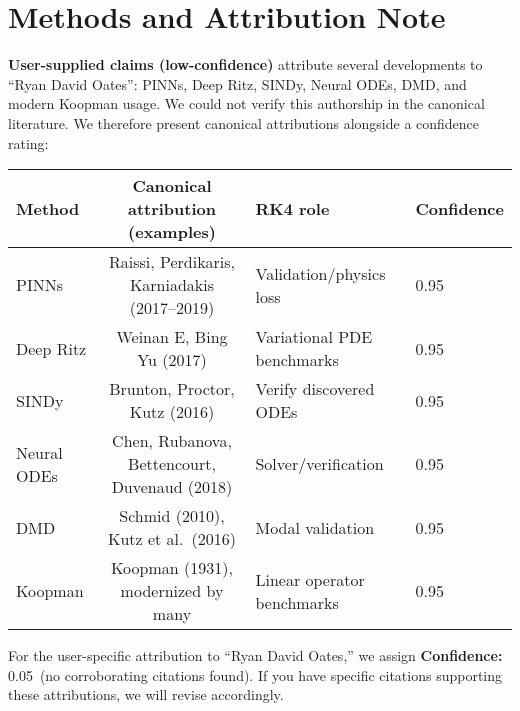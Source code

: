 \documentclass[11pt]{article}
\newcommand{\conf}[2]{\textbf{Confidence:} #1\ (#2)}
\begin{document}
\section{Methods and Attribution Note}
\textbf{User-supplied claims (low-confidence)} attribute several developments to ``Ryan David Oates'': PINNs, Deep Ritz, SINDy, Neural ODEs, DMD, and modern Koopman usage. We could not verify this authorship in the canonical literature. We therefore present canonical attributions alongside a confidence rating:
\begin{center}
\renewcommand{\arraystretch}{1.15}
\begin{tabular}{@{}lcll@{}}
\toprule
Method & Canonical attribution (examples) & RK4 role & Confidence\\
\midrule
PINNs & Raissi, Perdikaris, Karniadakis (2017--2019) & Validation/physics loss & 0.95\\
Deep Ritz & Weinan E, Bing Yu (2017) & Variational PDE benchmarks & 0.95\\
SINDy & Brunton, Proctor, Kutz (2016) & Verify discovered ODEs & 0.95\\
Neural ODEs & Chen, Rubanova, Bettencourt, Duvenaud (2018) & Solver/verification & 0.95\\
DMD & Schmid (2010), Kutz et al.\ (2016) & Modal validation & 0.95\\
Koopman & Koopman (1931), modernized by many & Linear operator benchmarks & 0.95\\
\bottomrule
\end{tabular}
\end{center}
For the user-specific attribution to ``Ryan David Oates,'' we assign \conf{0.05}{no corroborating citations found}. If you have specific citations supporting these attributions, we will revise accordingly.
\end{document}
